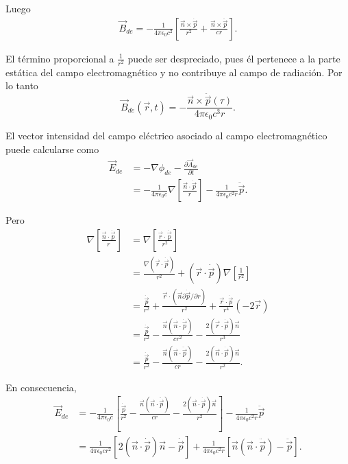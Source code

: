 \documentclass[12pt,a4paper]{book}
\begin{document}
Luego
\begin{align}
\vec{B}_{de} = -\frac{1}{4\pi\epsilon_0 c^2} \left[\frac{\vec{n} \times \dot{\vec{p}}}{r^2} + \frac{\vec{n} \times \ddot{\vec{p}}}{cr}\right].
\end{align}

El término proporcional a $\frac{1}{r^2}$ puede ser despreciado, pues él pertenece a la parte estática del campo electromagnético y no contribuye al campo de radiación. Por lo tanto
\begin{equation}
\vec{B}_{de}(\vec{r}, t) = -\frac{\vec{n} \times \ddot{\vec{p}}(\tau)}{4\pi\epsilon_0c^3 r}.
\end{equation}

El vector intensidad del campo eléctrico asociado al campo electromagnético puede calcularse como
\begin{align}
\vec{E}_{de} &= -\nabla\phi_{de} - \frac{\partial \vec{A}_{de}}{\partial t} \nonumber \\
&= -\frac{1}{4\pi\epsilon_0 c} \nabla\left[\frac{\vec{n} \cdot \dot{\vec{p}}}{r}\right] - \frac{1}{4\pi\epsilon_0 c^2r}\ddot{\vec{p}}.
\end{align}

Pero
\begin{align}
\nabla\left[\frac{\vec{n} \cdot \dot{\vec{p}}}{r}\right] &= \nabla\left[\frac{\vec{r} \cdot \dot{\vec{p}}}{r^2}\right] \nonumber \\
&= \frac{\nabla(\vec{r} \cdot \dot{\vec{p}})}{r^2} + (\vec{r} \cdot \dot{\vec{p}})\nabla\left[\frac{1}{r^2}\right] \nonumber \\
&= \frac{\dot{\vec{p}}}{r^2} + \frac{\vec{r} \cdot (\vec{n} \partial \dot{\vec{p}}/\partial r)}{r^2} + \frac{\vec{r} \cdot \dot{\vec{p}}}{r^4}(-2\vec{r}) \nonumber \\
&= \frac{\dot{\vec{p}}}{r^2} - \frac{\vec{n}(\vec{n} \cdot \dot{\vec{p}})}{cr^2} - \frac{2(\vec{r} \cdot \dot{\vec{p}})\vec{n}}{r^3} \nonumber \\
&= \frac{\dot{\vec{p}}}{r^2} - \frac{\vec{n}(\vec{n} \cdot \ddot{\vec{p}})}{cr} - \frac{2(\vec{n} \cdot \dot{\vec{p}})\vec{n}}{r^2}.
\end{align}

En consecuencia,
\begin{align}
\vec{E}_{de} &= -\frac{1}{4\pi\epsilon_0 c}\left[\frac{\dot{\vec{p}}}{r^2} - \frac{\vec{n}(\vec{n} \cdot \ddot{\vec{p}})}{cr} - \frac{2(\vec{n} \cdot \dot{\vec{p}})\vec{n}}{r^2}\right] - \frac{1}{4\pi\epsilon_0 c^2r}\ddot{\vec{p}} \nonumber \\
&= \frac{1}{4\pi\epsilon_0 cr^2}[2(\vec{n} \cdot \dot{\vec{p}})\vec{n} - \dot{\vec{p}}] + \frac{1}{4\pi\epsilon_0 c^2r}[\vec{n}(\vec{n} \cdot \ddot{\vec{p}}) - \ddot{\vec{p}}].
\end{align}
\end{document}

